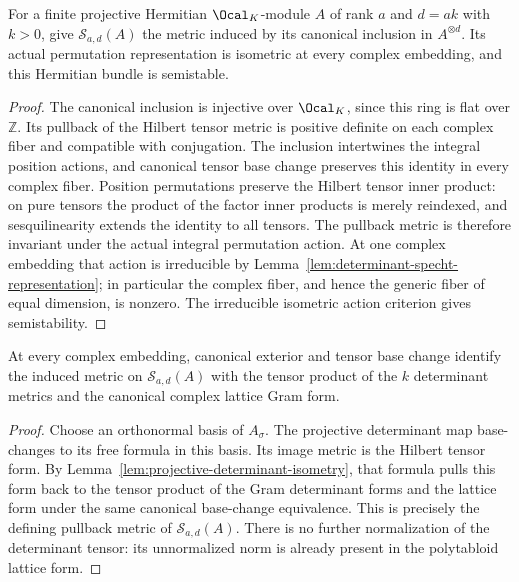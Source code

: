 \begin{lemma}
\label{lem:determinant-specht-semistable}
\leanok
For a finite projective Hermitian $\Ocal_K$-module $A$ of rank $a$ and
$d=ak$ with $k>0$, give $\mathcal S_{a,d}(A)$ the metric induced by
its canonical inclusion in $A^{\otimes d}$. Its actual permutation
representation is isometric at every complex embedding, and this
Hermitian bundle is semistable.
\end{lemma}
\begin{proof}
The canonical inclusion is injective over $\Ocal_K$, since this ring
is flat over $\mathbb Z$. Its pullback of the Hilbert tensor metric is
positive definite on each complex fiber and compatible with conjugation.
The inclusion intertwines the integral position actions, and canonical
tensor base change preserves this identity in every complex fiber.
Position permutations preserve the Hilbert tensor inner product: on
pure tensors the product of the factor inner products is merely
reindexed, and sesquilinearity extends the identity to all tensors.
The pullback metric is therefore invariant under the actual integral
permutation action. At one complex embedding that action is irreducible
by Lemma~\ref{lem:determinant-specht-representation}; in particular the
complex fiber, and hence the generic fiber of equal dimension, is
nonzero. The irreducible isometric action criterion gives semistability.
\end{proof}

\begin{lemma}
\label{lem:determinant-specht-fiber-metric}
\leanok
At every complex embedding, canonical exterior and tensor base change
identify the induced metric on $\mathcal S_{a,d}(A)$ with the tensor
product of the $k$ determinant metrics and the canonical complex lattice
Gram form.
\end{lemma}
\begin{proof}
Choose an orthonormal basis of $A_{\sigma}$. The projective determinant
map base-changes to its free formula in this basis. Its image metric is
the Hilbert tensor form. By Lemma~\ref{lem:projective-determinant-isometry},
that formula pulls this form back to the tensor product of the Gram
determinant forms and the lattice form under the same canonical
base-change equivalence. This is precisely the defining pullback metric
of $\mathcal S_{a,d}(A)$. There is no further normalization of the
determinant tensor: its unnormalized norm is already present in the
polytabloid lattice form.
\end{proof}

